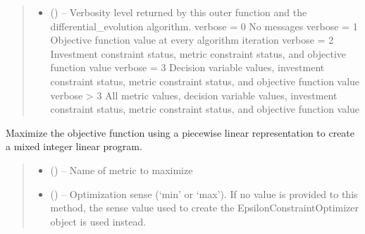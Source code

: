 \documentclass[letterpaper,10pt,english]{sphinxmanual}
\begin{document}
\begin{fulllineitems}
\begin{fulllineitems}
\begin{quote}
\begin{description}
\begin{itemize}
\item {} 
\sphinxAtStartPar
{} () – Verbosity level returned by this outer function and the
differential\_evolution algorithm.
verbose = 0     No messages
verbose = 1     Objective function value at every algorithm iteration
verbose = 2     Investment constraint status, metric constraint status,
and objective function value
verbose = 3     Decision variable values, investment constraint status,
metric constraint status, and objective function value
verbose > 3     All metric values, decision variable values, investment
constraint status, metric constraint status, and
objective function value

\end{itemize}

\end{description}\end{quote}

\end{fulllineitems}


\begin{fulllineitems}
\label{\detokenize{tyche:tyche.EpsilonConstraints.EpsilonConstraintOptimizer.opt_milp}}
\pysigstartsignatures
{}
\pysigstopsignatures
\sphinxAtStartPar
Maximize the objective function using a piecewise linear
representation to create a mixed integer linear program.
\begin{quote}\begin{description}
\begin{itemize}
\item {} 
\sphinxAtStartPar
{} () – Name of metric to maximize

\item {} 
\sphinxAtStartPar
{} () – Optimization sense (‘min’ or ‘max’). If no value is provided to this
method, the sense value used to create the EpsilonConstraintOptimizer
object is used instead.


\end{itemize}
\end{description}
\end{quote}
\end{fulllineitems}
\end{fulllineitems}
\end{document}
